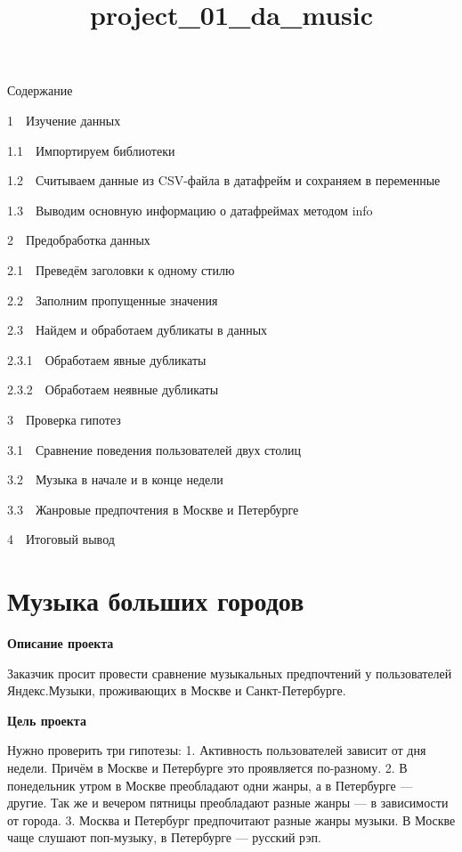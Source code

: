 \documentclass[11pt]{article}
\title{project\_01\_da\_music}
\begin{document}
    
    \maketitle
    
    

    
    Содержание{}

{{1~~}Изучение данных}

{{1.1~~}Импортируем библиотеки}

{{1.2~~}Считываем данные из CSV-файла в датафрейм и сохраняем в
переменные}

{{1.3~~}Выводим основную информацию о датафреймах методом info}

{{2~~}Предобработка данных}

{{2.1~~}Преведём заголовки к одному стилю}

{{2.2~~}Заполним пропущенные значения}

{{2.3~~}Найдем и обработаем дубликаты в данных}

{{2.3.1~~}Обработаем явные дубликаты}

{{2.3.2~~}Обработаем неявные дубликаты}

{{3~~}Проверка гипотез}

{{3.1~~}Сравнение поведения пользователей двух столиц}

{{3.2~~}Музыка в начале и в конце недели}

{{3.3~~}Жанровые предпочтения в Москве и Петербурге}

{{4~~}Итоговый вывод}

    \hypertarget{ux43cux443ux437ux44bux43aux430-ux431ux43eux43bux44cux448ux438ux445-ux433ux43eux440ux43eux434ux43eux432}{%
\section{\texorpdfstring{\textbf{Музыка больших
городов}}{Музыка больших городов}}\label{ux43cux443ux437ux44bux43aux430-ux431ux43eux43bux44cux448ux438ux445-ux433ux43eux440ux43eux434ux43eux432}}

    \textbf{Описание проекта}

Заказчик просит провести сравнение музыкальных предпочтений у
пользователей Яндекс.Музыки, проживающих в Москве и Санкт-Петербурге.

    \textbf{Цель проекта}

Нужно проверить три гипотезы: 1. Активность пользователей зависит от дня
недели. Причём в Москве и Петербурге это проявляется по-разному. 2. В
понедельник утром в Москве преобладают одни жанры, а в Петербурге ---
другие. Так же и вечером пятницы преобладают разные жанры --- в
зависимости от города. 3. Москва и Петербург предпочитают разные жанры
музыки. В Москве чаще слушают поп-музыку, в Петербурге --- русский рэп.
\end{document}
